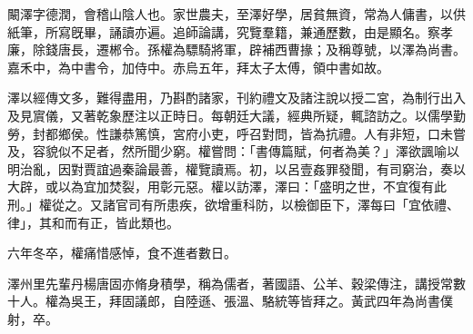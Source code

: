 \begin{pinyinscope}
 
 
 闞澤字德潤，會稽山陰人也。家世農夫，至澤好學，居貧無資，常為人傭書，以供紙筆，所寫旣畢，誦讀亦遍。追師論講，究覽羣籍，兼通歷數，由是顯名。察孝廉，除錢唐長，遷郴令。孫權為驃騎將軍，辟補西曹掾；及稱尊號，以澤為尚書。嘉禾中，為中書令，加侍中。赤烏五年，拜太子太傅，領中書如故。
 
 
 
 
 澤以經傳文多，難得盡用，乃斟酌諸家，刊約禮文及諸注說以授二宮，為制行出入及見賔儀，又著乾象歷注以正時日。每朝廷大議，經典所疑，輒諮訪之。以儒學勤勞，封都鄉侯。性謙恭篤慎，宮府小吏，呼召對問，皆為抗禮。人有非短，口未嘗及，容貌似不足者，然所聞少窮。權嘗問：「書傳篇賦，何者為美？」澤欲諷喻以明治亂，因對賈誼過秦論最善，權覽讀焉。初，以呂壹姦罪發聞，有司窮治，奏以大辟，或以為宜加焚裂，用彰元惡。權以訪澤，澤曰：「盛明之世，不宜復有此刑。」權從之。又諸官司有所患疾，欲增重科防，以檢御臣下，澤每曰「宜依禮、律」，其和而有正，皆此類也。
 
 
 六年冬卒，權痛惜感悼，食不進者數日。
 
 
澤州里先輩丹楊唐固亦脩身積學，稱為儒者，著國語、公羊、穀梁傳注，講授常數十人。權為吳王，拜固議郎，自陸遜、張溫、駱統等皆拜之。黃武四年為尚書僕射，卒。
 
 
\end{pinyinscope}